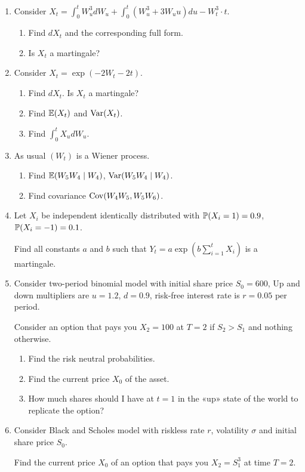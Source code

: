 \begin{enumerate}

\item Consider $X_t = \int_0^t W_u^3 dW_u + \int_0^t (W_u^3 + 3W_u u ) du - W_t^3 \cdot t$.

\begin{enumerate}
    \item Find $dX_t$ and the corresponding full form. 
    \item Is $X_t$ a martingale?
\end{enumerate}

\item Consider $X_t = \exp(-2W_t - 2t)$.
\begin{enumerate}
    \item Find $dX_t$. Is $X_t$ a martingale?
    \item Find $\E(X_t)$ and $\Var(X_t)$.
    \item Find $\int_0^t X_u dW_u$.
\end{enumerate}

\item As usual $(W_t)$ is a Wiener process.
\begin{enumerate}
    \item Find $\E(W_5 W_4 \mid W_4)$, $\Var(W_5 W_4 \mid W_4)$.
    \item Find covariance $\Cov(W_4 W_5, W_5 W_6)$.
\end{enumerate}

\item Let $X_i$ be independent identically distributed with $\P(X_i = 1) = 0.9$, $\P(X_i = -1 ) = 0.1$. 

Find all constants $a$ and $b$ such that $Y_t = a \exp\left(b\sum_{i=1}^t X_i\right)$ is a martingale. 

\item Consider two-period binomial model with initial share price $S_0 = 600$, 
Up and down multipliers are $u=1.2$, $d=0.9$, risk-free interest rate is $r = 0.05$ per period. 

Consider an option that pays you $X_2 = 100$ at $T=2$ if $S_2 > S_1$ and nothing otherwise. 

\begin{enumerate}
    \item Find the risk neutral probabilities. 
    \item Find the current price $X_0$ of the asset. 
    \item How much shares should I have at $t=1$ in the «up» state of the world to replicate the option?
\end{enumerate}

\item Consider Black and Scholes model with riskless rate $r$, volatility $\sigma$ and initial share price $S_0$. 

Find the current price $X_0$ of an option that pays you $X_2 = S_1^3$ at time $T=2$. 

\end{enumerate}




